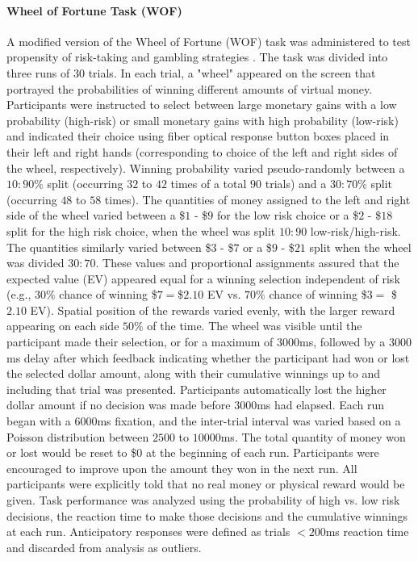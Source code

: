 \documentclass[utf8]{frontiersSCNS} %
\begin{document}
\paragraph{Wheel of Fortune Task (WOF)} A modified version of the Wheel of Fortune (WOF) task was administered to test propensity of risk-taking and gambling strategies \citep{ernst2004wheeloffortune}. The task was divided into three runs of 30 trials. In each trial, a "wheel" appeared on the screen that portrayed the probabilities of winning different amounts of virtual money. Participants were instructed to select between large monetary gains with a low probability (high-risk) or small monetary gains with high probability (low-risk) and indicated their choice using fiber optical response button boxes placed in their left and right hands (corresponding to choice of the left and right sides of the wheel, respectively). Winning probability varied pseudo-randomly between a $10:90\%$ split (occurring $32$ to $42$ times of a total $90$ trials) and a $30:70\%$ split (occurring $48$ to $58$ times). The quantities of money assigned to the left and right side of the wheel varied between a \$$1$ - \$$9$ for the low risk choice or a \$$2$ - \$$18$ split for the high risk choice, when the wheel was split $10:90$ low-risk/high-risk. The quantities similarly varied between \$$3$ - \$$7$ or a \$$9$ - \$$21$ split when the wheel was divided $30:70$.  These values and proportional assignments assured that the expected value (EV) appeared equal for a winning selection independent of risk (e.g., $30\%$ chance of winning \$$7 = $\$$2.10$ EV vs. $70\%$ chance of winning \$$3 =$ \$$2.10$ EV).  Spatial position of the rewards varied evenly, with the larger reward appearing on each side $50\%$ of the time.  The wheel was visible until the participant made their selection, or for a maximum of $3000$ms, followed by a $3000$ms delay after which feedback indicating whether the participant had won or lost the selected dollar amount, along with their cumulative winnings up to and including that trial was presented.  Participants automatically lost the higher dollar amount if no decision was made before $3000$ms had elapsed.  Each run began with a $6000$ms fixation, and the inter-trial interval was varied based on a Poisson distribution between $2500$ to $10000$ms. The total quantity of money won or lost would be reset to \$$0$ at the beginning of each run. Participants were encouraged to improve upon the amount they won in the next run.  All participants were explicitly told that no real money or physical reward would be given. Task performance was analyzed using the probability of high vs. low risk decisions, the reaction time to make those decisions and the cumulative winnings at each run. Anticipatory responses were defined as trials $<200$ms reaction time and discarded from analysis as outliers.
\end{document}
